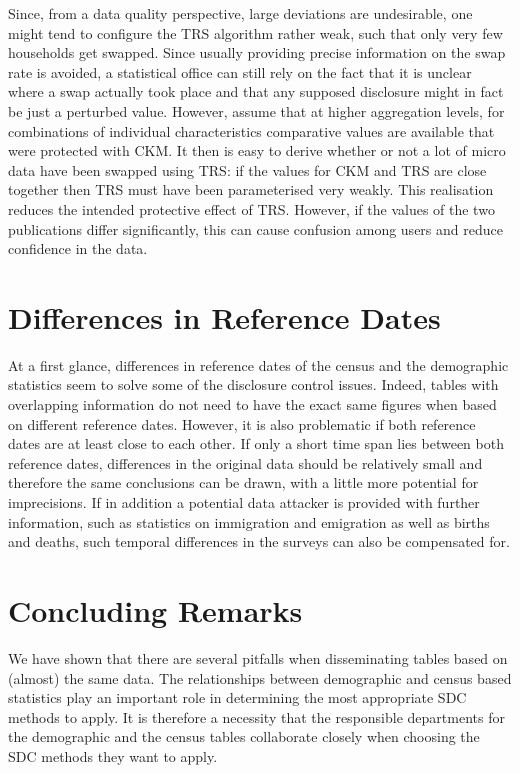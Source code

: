 Since, from a data quality perspective, large deviations are undesirable, one might tend to configure the TRS algorithm rather weak, such that only very few households get swapped. Since usually providing precise information on the swap rate is avoided, a statistical office can still rely on the fact that it is unclear where a swap actually took place and that any supposed disclosure might in fact be just a perturbed value.
However, assume that at higher aggregation levels, for combinations of individual characteristics comparative values are available that were protected with CKM. It then is easy to derive whether or not a lot of micro data have been swapped using TRS: if the values for CKM and TRS are close together then TRS must have been parameterised very weakly. This realisation reduces the intended protective effect of TRS. However, if the values of the two publications differ significantly, this can cause confusion among users and reduce confidence in the data.




\section{Differences in Reference Dates}
At a first glance, differences in reference dates of the census and the demographic statistics seem to solve some of the disclosure control issues. Indeed, tables with overlapping information do not need to have the exact same figures when based on different reference dates. However, it is also problematic if both reference dates are at least close to each other. If only a short time span lies between both reference dates, differences in the original data should be relatively small and therefore the same conclusions can be drawn, with a little more potential for imprecisions.
If in addition a potential data attacker is provided with further information, such as statistics on immigration and emigration as well as births and deaths, such temporal differences in the surveys can also be compensated for. 

\section{Concluding Remarks}
We have shown that there are several pitfalls when disseminating tables based on (almost) the same data. The relationships between demographic and census based statistics play an important role in determining the most appropriate SDC methods to apply. It is therefore a necessity that the responsible departments for the demographic and the census tables collaborate closely when choosing the SDC methods they want to apply.

